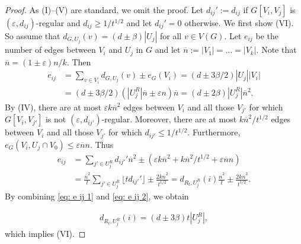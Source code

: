 \documentclass[a4paper, 11pt, reqno]{amsart}
\numberwithin{equation}{section}
\newcommand{\1}{{\rm 1\hspace*{-0.4ex}%
\rule{0.1ex}{1.52ex}\hspace*{0.2ex}}}
\renewcommand{\epsilon}{\varepsilon}
\newcommand{\COMMENT}[1]{}
\begin{document}
\begin{proof}
As (I)--(V) are standard, we omit the proof.
Let $d_{ij}':=d_{ij}$ if $G[V_i,V_j]$ is $(\epsilon,d_{ij})$-regular and $d_{ij}\geq 1/t^{1/2}$ and let $d_{ij}'=0$ otherwise.
We first show (VI). 
So assume that $d_{G,U_j}(v) = (d\pm \beta) |U_j|$ for all $v\in V(G)$. 
Let $e_{ij}$ be the number of edges between $V_i$ and $U_j$ in $G$ and let $ \overline{n}:=|V_1|=\dots=|V_k|$.
Note that $\overline{n}= (1\pm \epsilon)n/k.$
Then
\begin{align}\label{eq: e ij 1}
	e_{ij} 
	&= \sum_{v\in V_i}d_{G,U_j}(v) \pm e_G(V_i)
	= (d\pm 3\beta/2)|U_j||V_i| \nonumber \\
	&= (d\pm 3\beta/2)(|U_j^R|\overline{n}\pm \epsilon n)\overline{n}
	=(d\pm 2\beta)|U_j^R|\overline{n}^2.
\end{align}
By (IV), there are at most $\epsilon k \overline{n}^2$ edges between $V_i$ and all those $V_{j'}$ for which $G[V_i,V_{j'}]$ is not $(\epsilon,d_{ij'})$-regular.
Moreover, there are at most $k\overline{n}^2/t^{1/2}$ edges between $V_i$ and all those $V_{j'}$ for which $d_{ij'}\leq 1/t^{1/2}$. Furthermore, $e_{G}(V_i,U_j\cap V_0) \leq \epsilon \overline{n}n$. Thus 
\begin{align}\label{eq: e ij 2}
e_{ij} &= \sum_{j'\in U_j^R} d_{ij'}' \overline{n}^2 \pm (\epsilon k \overline{n}^2 + k\overline{n}^2/t^{1/2} + \epsilon \overline{n} n)  \nonumber \\
        &= \frac{\overline{n}^2}{t}\sum_{j'\in U_j^R} \lfloor td_{ij'}'\rfloor \pm \frac{2k\overline{n}^2}{t^{1/2}} 
				= d_{R_t, U_j^R}(i) \frac{\overline{n}^2}{t} \pm \frac{2k\overline{n}^2}{t^{1/2}} .
\end{align}
By combining \eqref{eq: e ij 1} and \eqref{eq: e ij 2}, we obtain
\COMMENT{
\begin{align*}
	((d\pm 2\beta)|U_j^R| \pm \frac{2k}{t^{1/2}})\overline{n}^2 \cdot \frac{t}{\overline{n}^2}
	= (d\pm 2\beta)t|U_j^R| \pm 2k t^{1/2}
	= (d\pm 2\beta \pm \frac{2k}{t^{1/2}|U_j^R|})t|U_j^R| 
	= (d\pm 3\beta )t|U_j^R| 
\end{align*}
since $|U_j^R|= \frac{k}{s}$ and $1/t\ll \beta$.
}
\begin{align*}
d_{R_t,U_j^R}(i)= (d\pm 3\beta)t|U_j^R|,
\end{align*}
which implies (VI).


\end{proof}
\end{document}
